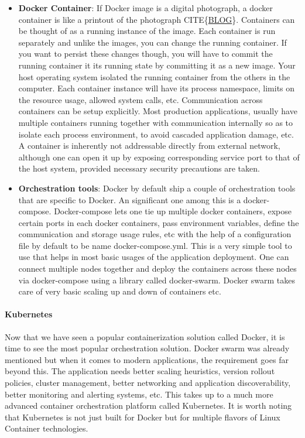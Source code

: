\documentclass[12pt,titlepage]{article}
\begin{document}
\begin{itemize}
\item \textbf{Docker Container}: If Docker image is a digital photograph, a docker container is like a printout
of the photograph CITE\{\href{https://stackify.com/docker-image-vs-container-everything-you-need-to-know/}{BLOG}\}. Containers can be thought of as a running instance
of the image. Each container is run separately and unlike the images, you can
change the running container. If you want to persist these changes though, you
will have to commit the running container it its running state by committing it
as a new image. Your host operating system isolated the running container from
the others in the computer. Each container instance will have its process
namespace, limits on the resource usage, allowed system calls, etc.
Communication across containers can be setup explicitly. Most production
applications, usually have multiple containers running together with
communication internally so as to isolate each process environment, to avoid
cascaded application damage, etc. A container is inherently not addressable
directly from external network, although one can open it up by exposing
corresponding service port to that of the host system, provided necessary
security precautions are taken.

\item \textbf{Orchestration tools}: Docker by default ship a couple of orchestration tools that are specific to
Docker. An significant one among this is a docker-compose. Docker-compose lets
one tie up multiple docker containers, expose certain ports in each docker
containers, pass environment variables, define the communication and storage
usage rules, etc with the help of a configuration file by default to be name
docker-compose.yml. This is a very simple tool to use that helps in most basic
usages of the application deployment. One can connect multiple nodes together
and deploy the containers across these nodes via docker-compose using a library
called docker-swarm. Docker swarm takes care of very basic scaling up and down
of containers etc.
\end{itemize}

\paragraph{Kubernetes}
\label{sec:org80b4036}
Now that we have seen a popular containerization solution called Docker, it is
time to see the most popular orchestration solution. Docker swarm was already
mentioned but when it comes to modern applications, the requirement goes far
beyond this. The application needs better scaling heuristics, version rollout
policies, cluster management, better networking and application discoverability,
better monitoring and alerting systems, etc. This takes up to a much more
advanced container orchestration platform called Kubernetes. It is worth noting
that Kubernetes is not just built for Docker but for multiple flavors of Linux
Container technologies.
\end{document}
